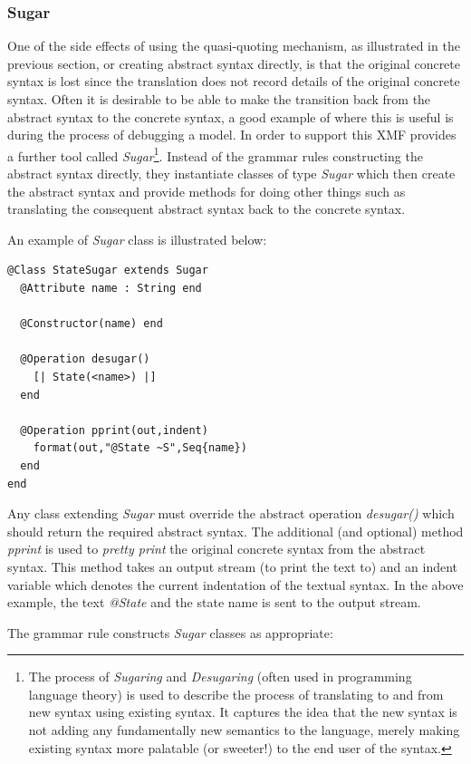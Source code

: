 \subsubsection{Sugar}

One of the side effects of using the quasi-quoting mechanism, as illustrated in the previous section, or creating abstract syntax directly, is that the original concrete syntax is lost since the translation does not record details of the original concrete syntax.   Often it is desirable to be able to make the transition back from the abstract syntax to the concrete syntax, a good example of where this is useful is during the process of debugging a model.  In order to support this XMF provides a further tool called \emph{Sugar}\footnote{The process of \emph{Sugaring} and \emph{Desugaring} (often used in programming language theory) is used to describe the process of translating to and from new syntax using existing syntax.  It captures the idea that the new syntax is not adding any fundamentally new semantics to the language, merely making existing syntax more palatable (or sweeter!) to the end user of the syntax.}.  Instead of the grammar rules constructing the abstract syntax directly, they instantiate classes of type \emph{Sugar} which then create the abstract syntax and provide methods for doing other things such as translating the consequent abstract syntax back to the concrete syntax.

An example of \emph{Sugar} class is illustrated below:

\begin{lstlisting}
@Class StateSugar extends Sugar
  @Attribute name : String end

  @Constructor(name) end

  @Operation desugar()
    [| State(<name>) |]
  end

  @Operation pprint(out,indent)
    format(out,"@State ~S",Seq{name})
  end
end
\end{lstlisting}Any class extending \emph{Sugar} must override the abstract operation \emph{desugar()} which should return the required abstract syntax.  The additional (and optional) method \emph{pprint} is used to \emph{pretty print} the original concrete syntax from the abstract syntax.  This method takes an output stream (to print the text to) and an indent variable which denotes the current indentation of the textual syntax.  In the above example, the text \emph{@State} and the state name is sent to the output stream.

The grammar rule constructs \emph{Sugar} classes as appropriate:


